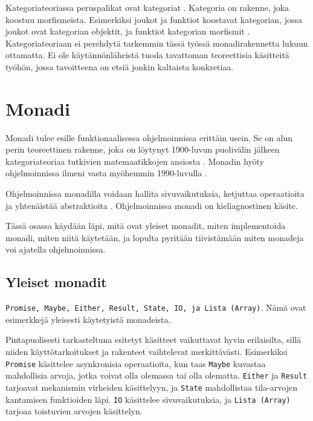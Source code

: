 Kategoriateoriassa peruspalikat ovat kategoriat \cite[9]{milewski2017category}. Kategoria on rakenne, joka koostuu morfismeista. Esimerkiksi joukot ja funktiot koostavat kategorian, jossa joukot ovat kategorian objektit, ja funktiot kategorian morfismit \cite{category_theory}. Kategoriateoriaan ei perehdytä tarkemmin tässä työssä monadirakennetta lukuun ottamatta. Ei ole käytännönläheistä tuoda tavattoman teoreettisia käsitteitä työhön, jossa tavoitteena on etsiä jonkin kaltaista konkretiaa.


\section{Monadi}

Monadi tulee esille funktionaalisessa ohjelmoinnissa erittäin usein. Se on alun perin teoreettinen rakenne, joka on löytynyt 1900-luvun puolivälin jälkeen kategoriateoriaa tutkivien matemaatikkojen ansiosta \cite{Beck2003}. Monadin hyöty ohjelmoinnissa ilmeni vasta myöhemmin 1990-luvulla \cite{computerphile_monad}.

Ohjelmoinnissa monadilla voidaan hallita sivuvaikutuksia, ketjuttaa operaatioita ja yhtenäistää abstraktioita \cite{computerphile_monad,bartosz_category_for_progamers_10,stackoverflow_what_monad}. Ohjelmoinnissa monadi on kieliagnostinen käsite.

Tässä osassa käydään läpi, mitä ovat yleiset monadit, miten implementoida monadi, miten niitä käytetään, ja lopulta pyritään tiivistämään miten monadeja voi ajatella ohjelmoinnissa.

\subsection{Yleiset monadit}

\texttt{Promise, Maybe, Either, Result, State, IO, ja Lista (Array)}. Nämä ovat esimerkkejä yleisesti käytetyistä monadeista. \cite{monad_wikipedia,bartosz_category_for_progamers_10}

Pintapuolisesti tarkasteltuna esitetyt käsitteet vaikuttavat hyvin erilaisilta, sillä niiden käyttötarkoitukset ja rakenteet vaihtelevat merkittävästi. Esimerkiksi \texttt{Promise} käsittelee asynkronisia operaatioita, kun taas \texttt{Maybe} kuvastaa mahdollisia arvoja, jotka voivat olla olemassa tai olla olematta. \texttt{Either} ja \texttt{Result} tarjoavat mekanismin virheiden käsittelyyn, ja \texttt{State} mahdollistaa tila-arvojen kantamisen funktioiden läpi. \texttt{IO} käsittelee sivuvaikutuksia, ja \texttt{Lista (Array)} tarjoaa toistuvien arvojen käsittelyn.

